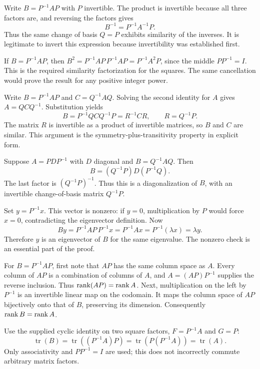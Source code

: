 Write $B=P^{-1}AP$ with $P$ invertible. The product is invertible because all three factors are, and reversing the factors gives
\[
B^{-1}=P^{-1}A^{-1}P.
\]
Thus the same change of basis $Q=P$ exhibits similarity of the inverses. It is legitimate to invert this expression because invertibility was established first.

If $B=P^{-1}AP$, then $B^2=P^{-1}AP\,P^{-1}AP=P^{-1}A^2P$, since the middle $PP^{-1}=I$. This is the required similarity factorization for the squares. The same cancellation would prove the result for any positive integer power.

Write $B=P^{-1}AP$ and $C=Q^{-1}AQ$. Solving the second identity for $A$ gives $A=QCQ^{-1}$. Substitution yields
\[
B=P^{-1}QCQ^{-1}P=R^{-1}CR,\qquad R=Q^{-1}P.
\]
The matrix $R$ is invertible as a product of invertible matrices, so $B$ and $C$ are similar. This argument is the symmetry-plus-transitivity property in explicit form.

Suppose $A=PDP^{-1}$ with $D$ diagonal and $B=Q^{-1}AQ$. Then
\[
B=(Q^{-1}P)D(P^{-1}Q).
\]
The last factor is $(Q^{-1}P)^{-1}$. Thus this is a diagonalization of $B$, with an invertible change-of-basis matrix $Q^{-1}P$.

Set $y=P^{-1}x$. This vector is nonzero: if $y=0$, multiplication by $P$ would force $x=0$, contradicting the eigenvector definition. Now
\[
By=P^{-1}AP\,P^{-1}x=P^{-1}Ax=P^{-1}(\lambda x)=\lambda y.
\]
Therefore $y$ is an eigenvector of $B$ for the same eigenvalue. The nonzero check is an essential part of the proof.

For $B=P^{-1}AP$, first note that $AP$ has the same column space as $A$. Every column of $AP$ is a combination of columns of $A$, and $A=(AP)P^{-1}$ supplies the reverse inclusion. Thus $\operatorname{rank}(AP)=\operatorname{rank} A$. Next, multiplication on the left by $P^{-1}$ is an invertible linear map on the codomain. It maps the column space of $AP$ bijectively onto that of $B$, preserving its dimension. Consequently $\operatorname{rank} B=\operatorname{rank} A$.

Use the supplied cyclic identity on two square factors, $F=P^{-1}A$ and $G=P$:
\[
\operatorname{tr}(B)=\operatorname{tr}((P^{-1}A)P)
=\operatorname{tr}(P(P^{-1}A))=\operatorname{tr}(A).
\]
Only associativity and $PP^{-1}=I$ are used; this does not incorrectly commute arbitrary matrix factors.

